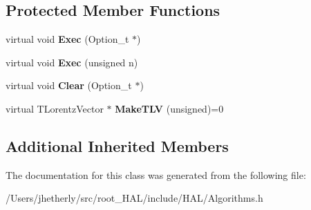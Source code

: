 \subsection*{Protected Member Functions}
\begin{DoxyCompactItemize}
\item 
\hypertarget{class_h_a_l_1_1_import_t_l_v_algo_aedad6d4046eea13e361b4104e44217ca}{virtual void {\bfseries Exec} (Option\-\_\-t $\ast$)}\label{class_h_a_l_1_1_import_t_l_v_algo_aedad6d4046eea13e361b4104e44217ca}

\item 
\hypertarget{class_h_a_l_1_1_import_t_l_v_algo_a244c49b3d20537f089452c911dc18dfc}{virtual void {\bfseries Exec} (unsigned n)}\label{class_h_a_l_1_1_import_t_l_v_algo_a244c49b3d20537f089452c911dc18dfc}

\item 
\hypertarget{class_h_a_l_1_1_import_t_l_v_algo_aa9af7bb8a480bb31434f4e1c53cddd66}{virtual void {\bfseries Clear} (Option\-\_\-t $\ast$)}\label{class_h_a_l_1_1_import_t_l_v_algo_aa9af7bb8a480bb31434f4e1c53cddd66}

\item 
\hypertarget{class_h_a_l_1_1_import_t_l_v_algo_a46386035cffeea3764f49ca0fb3280e3}{virtual T\-Lorentz\-Vector $\ast$ {\bfseries Make\-T\-L\-V} (unsigned)=0}\label{class_h_a_l_1_1_import_t_l_v_algo_a46386035cffeea3764f49ca0fb3280e3}

\end{DoxyCompactItemize}
\subsection*{Additional Inherited Members}


The documentation for this class was generated from the following file\-:\begin{DoxyCompactItemize}
\item 
/\-Users/jhetherly/src/root\-\_\-\-H\-A\-L/include/\-H\-A\-L/Algorithms.\-h\end{DoxyCompactItemize}

